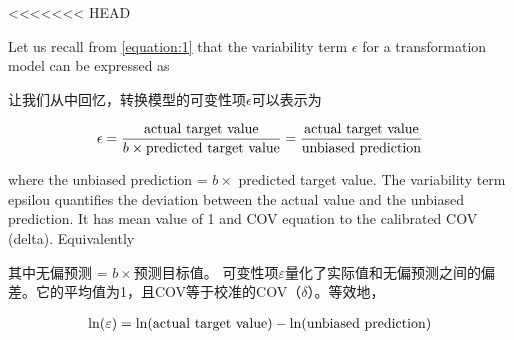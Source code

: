 <<<<<<< HEAD
\begin{paracol}{2}

    Let us recall from \autoref{equation:1} that the variability term $\epsilon$ for a  transformation model can be expressed as

    \switchcolumn

    让我们从中回忆，转换模型的可变性项$\epsilon$可以表示为
\end{paracol}

\begin{align}
    \epsilon=\dfrac{\rm{actual~target~value}}{b\times{}\rm{predicted~target~value}}=\dfrac{\rm{actual~target~value}}{\rm{unbiased~prediction}}
    \label{equation:2}
\end{align}

\begin{paracol}{2}

    where the unbiased prediction = $b\times$ predicted target value. The variability term epsilou quantifies the deviation between the actual value and the unbiased prediction. It has mean value of 1 and COV equation to the calibrated COV (delta). Equivalently

    \switchcolumn

    其中无偏预测 = $b\times$预测目标值。 可变性项$\varepsilon$量化了实际值和无偏预测之间的偏差。它的平均值为1，且COV等于校准的COV（$\delta$）。等效地，
\end{paracol}

\begin{align}
    \ln(\varepsilon)=\ln(\rm{actual~target~value})-\ln({\rm{unbiased~prediction}})
    \label{equation:3}
\end{align}

